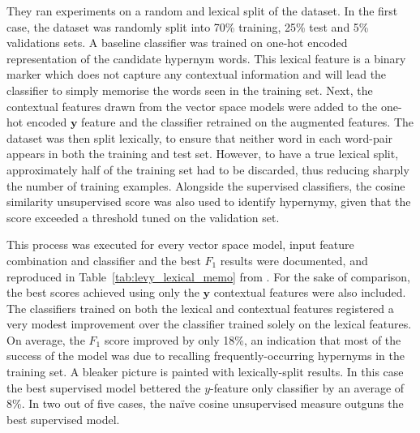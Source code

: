 They ran experiments on a random and lexical split of the dataset.  In the first case, the dataset was randomly split into 70\% training, 25\% test and 5\% validations sets.  A baseline classifier was trained on one-hot encoded representation of the candidate hypernym words.  This lexical feature is a binary marker which does not capture any contextual information and will lead the classifier to simply memorise the words seen in the training set.   Next, the contextual features drawn from the vector space models were added to the one-hot encoded $\bm{y}$ feature and the classifier retrained on the augmented features.  The dataset was then split lexically, to ensure that neither word in each word-pair appears in both the training and test set.  However, to have a true lexical split, approximately half of the training set had to be discarded, thus reducing sharply the number of training examples.  Alongside the supervised classifiers, the cosine similarity unsupervised score was also used to identify hypernymy, given that the score exceeded a threshold tuned on the validation set.

This process was executed for every vector space model, input feature combination and classifier and the best $F_1$ results were documented, and reproduced in Table~\ref{tab:levy_lexical_memo} from \citet{levy2015supervised}.  For the sake of comparison, the best scores achieved using only the $\bm{y}$ contextual features were also included.  The classifiers trained on both the  lexical and contextual features registered a very modest improvement over the classifier trained solely on the lexical features.  On average, the $F_1$ score improved by only 18\%, an indication that most of the success of the model was due to recalling frequently-occurring hypernyms in the training set.  A bleaker picture is painted with lexically-split results.  In this case the best supervised model bettered the $y$-feature only classifier by an average of 8\%.  In two out of five cases, the na\"ive cosine unsupervised measure outguns the best supervised model.  

